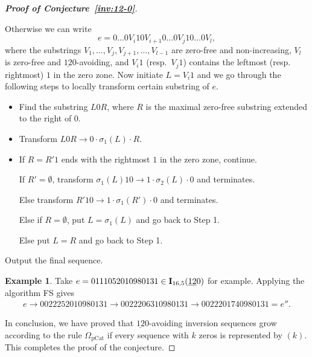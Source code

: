 \documentclass[12pt,A4]{amsart}
\numberwithin{equation}{section}
\theoremstyle{plain}
\theoremstyle{definition}
\newtheorem{example}[theorem]{Example}
\def\I{\operatorname{{\bf I}}}
\begin{document}
\begin{proof}[{\bf Proof of Conjecture~\ref{inv:12-0}}]
\begin{framed}
Otherwise we can write $$e=0\ldots0V_i 10V_{i+1}0\ldots 0V_j10\ldots0V_{l},$$ where the substrings $V_1,\ldots,V_{j},V_{j+1},\ldots,V_{l-1}$ are zero-free and non-increasing, $V_{l}$ is zero-free and $\underline{12}0$-avoiding, and  $V_i1$  (resp.~$V_j1$) contains the leftmost (resp. rightmost) $1$ in the zero zone. Now initiate $L=V_i1$ and we go through the following steps to locally transform certain substring of $e$. 
\begin{itemize}
	\item[Step 1] Find the substring $L 0 R$, where $R$ is the maximal zero-free substring extended to the right of $0$.
	\item[Step 2] Transform $L 0 R\rightarrow 0\cdot\sigma_{1}(L)\cdot R$. 
    \item[Step 3] If $R=R'1$ ends with the rightmost $1$ in the zero zone, continue.

    If $R'=\emptyset$, transform $\sigma_1(L)10\rightarrow 1\cdot\sigma_{2}(L)\cdot0$ and terminates.

    Else transform $R'10\rightarrow 1\cdot\sigma_{1}(R')\cdot0$ and terminates.

    \noindent Else if $R=\emptyset$, put $L=\sigma_1(L)$ and go back to Step 1.

    \noindent Else put $L=R$ and go back to Step 1.
\end{itemize}
\noindent Output the final sequence.

\begin{example} Take $e=0111052010980131\in\I_{16,5}(\underline{12}0)$  for example. Applying  the algorithm FS gives
\begin{align*}
e\rightarrow 0022252010980131\rightarrow 0022206310980131\rightarrow0022201740980131=e''.
\end{align*}
\end{example}
\end{framed}

In conclusion, we have proved that $\underline{12}0$-avoiding inversion sequences grow according to  the rule $\Omega_{\mathrm{pCat}}$ if every sequence with $k$ zeros is represented by $(k)$. This completes the proof of the conjecture. 
\end{proof}
\end{document}
